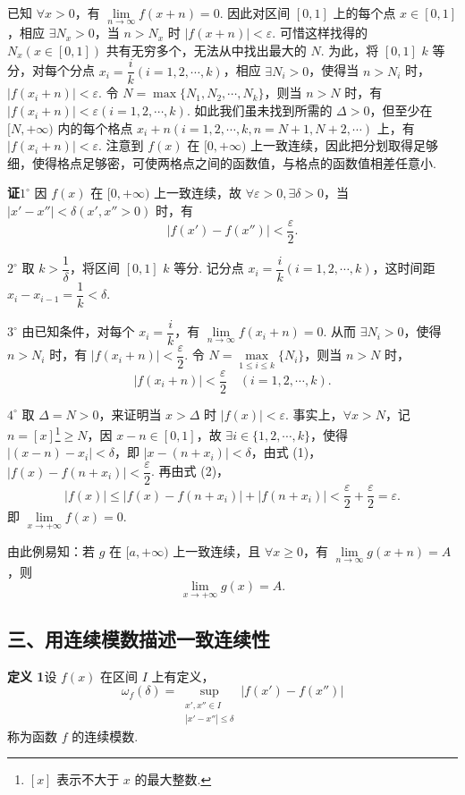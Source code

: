 \documentclass[UTF8,12pt,a4paper,fontset=fandol]{ctexart}
\begin{document}
已知 $\forall x>0$，有 $\lim\limits_{n\to\infty}f(x+n)=0$. 因此对区间 $[0,1]$ 上的每个点 $x\in[0,1]$，相应 $\exists N_x>0$，当 $n>N_x$ 时 $|f(x+n)|<\varepsilon$. 可惜这样找得的 $N_x(x\in[0,1])$ 共有无穷多个，无法从中找出最大的 $N$. 为此，将 $[0,1]$ $k$ 等分，对每个分点 $x_i=\dfrac ik(i=1,2,\cdots,k)$，相应 $\exists N_i>0$，使得当 $n>N_i$ 时，$|f(x_i+n)|<\varepsilon$. 令 $N=\max\{N_1,N_2,\cdots,N_k\}$，则当 $n>N$ 时，有 $|f(x_i+n)|<\varepsilon(i=1,2,\cdots,k)$. 如此我们虽未找到所需的 $\Delta>0$，但至少在 $[N,+\infty)$ 内的每个格点 $x_i+n(i=1,2,\cdots,k,n=N+1,N+2,\cdots)$ 上，有 $|f(x_i+n)|<\varepsilon$. 注意到 $f(x)$ 在 $[0,+\infty)$ 上一致连续，因此把分划取得足够细，使得格点足够密，可使两格点之间的函数值，与格点的函数值相差任意小.

\noindent\textbf{证}\quad $1^\circ$ 因 $f(x)$ 在 $[0,+\infty)$ 上一致连续，故 $\forall\varepsilon>0,\exists\delta>0$，当 $|x'-x''|<\delta(x',x''>0)$ 时，有
\[
  |f(x')-f(x'')|<\frac\varepsilon2. \tag{1}
\]

$2^\circ$ 取 $k>\dfrac1\delta$，将区间 $[0,1]$ $k$ 等分. 记分点 $x_i=\dfrac ik(i=1,2,\cdots,k)$，这时间距 $x_i-x_{i-1}=\dfrac1k<\delta$.

$3^\circ$ 由已知条件，对每个 $x_i=\dfrac ik$，有 $\lim\limits_{n\to\infty}f(x_i+n)=0$. 从而 $\exists N_i>0$，使得 $n>N_i$ 时，有 $|f(x_i+n)|<\dfrac\varepsilon2$. 令 $N=\max\limits_{1\le i\le k}\{N_i\}$，则当 $n>N$ 时，
\[
  |f(x_i+n)|<\frac\varepsilon2\quad(i=1,2,\cdots,k). \tag{2}
\]

$4^\circ$ 取 $\Delta=N>0$，来证明当 $x>\Delta$ 时 $|f(x)|<\varepsilon$. 事实上，$\forall x>N$，记 $n=[x]$\footnote{$[x]$ 表示不大于 $x$ 的最大整数.}$\ge N$，因 $x-n\in[0,1]$，故 $\exists i\in\{1,2,\cdots,k\}$，使得 $|(x-n)-x_i|<\delta$，即 $|x-(n+x_i)|<\delta$，由式 (1)，$|f(x)-f(n+x_i)|<\dfrac\varepsilon2$. 再由式 (2)，
\[
  |f(x)|\le |f(x)-f(n+x_i)|+|f(n+x_i)|<\frac\varepsilon2+\frac\varepsilon2=\varepsilon.
\]
即 $\lim\limits_{x\to+\infty}f(x)=0$.

由此例易知：若 $g$ 在 $[a,+\infty)$ 上一致连续，且 $\forall x\ge0$，有 $\lim\limits_{n\to\infty}g(x+n)=A$，则
\[
  \lim_{x\to+\infty}g(x)=A.
\]

\subsection*{三、用连续模数描述一致连续性}

\noindent\textbf{定义 1}\quad 设 $f(x)$ 在区间 $I$ 上有定义，
\[
  \omega_f(\delta)=\sup_{\substack{x',x''\in I\\ |x'-x''|\le\delta}}|f(x')-f(x'')|
\]
称为函数 $f$ 的连续模数.
\end{document}
